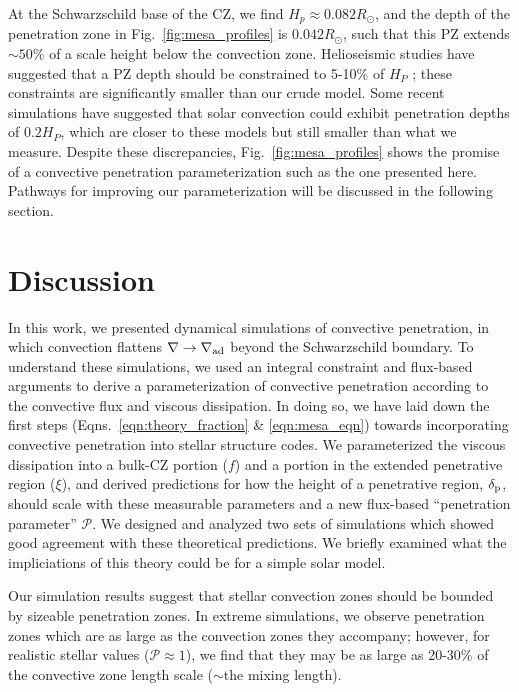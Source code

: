\documentclass[twocolumn]{aastex631}
\newcommand{\gradad}{\ensuremath{\nabla_{\rm{ad}}}}
\newcommand{\justgrad}{\ensuremath{\nabla}}
\newcommand{\delp}{\ensuremath{\delta_{\rm{p}}}}
\newcommand{\mP}{\ensuremath{\mathcal{P}}}
\begin{document}
At the Schwarzschild base of the CZ, we find $H_p \approx 0.082R_\odot$, and the depth of the penetration zone in Fig.~\ref{fig:mesa_profiles} is $0.042R_\odot$, such that this PZ extends $\sim 50$\% of a scale height below the convection zone.
Helioseismic studies have suggested that a PZ depth should be constrained to 5-10\% of $H_P$ \citep{basu_etal_1994, basu2016}; these constraints are significantly smaller than our crude model.
Some recent simulations \citep{kapyla2019} have suggested that solar convection could exhibit penetration depths of $0.2 H_P$, which are closer to these models but still smaller than what we measure.
Despite these discrepancies, Fig.~\ref{fig:mesa_profiles} shows the promise of a convective penetration parameterization such as the one presented here.
Pathways for improving our parameterization will be discussed in the following section.


\section{Discussion}
\label{sec:discussion}
In this work, we presented dynamical simulations of convective penetration, in which convection flattens $\justgrad \rightarrow \gradad$ beyond the Schwarzschild boundary.
To understand these simulations, we used an integral constraint \citep[reminiscent of][]{roxburgh1989} and flux-based arguments \citep[similar to][]{zahn1991} to derive a parameterization of convective penetration according to the convective flux and viscous dissipation.
In doing so, we have laid down the first steps (Eqns.~\ref{eqn:theory_fraction} \& \ref{eqn:mesa_eqn}) towards incorporating convective penetration into stellar structure codes.
We parameterized the viscous dissipation into a bulk-CZ portion ($f$) and a portion in the extended penetrative region ($\xi$), and derived predictions for how the height of a penetrative region, $\delp$, should scale with these measurable parameters and a new flux-based ``penetration parameter'' $\mP$.
We designed and analyzed two sets of simulations which showed good agreement with these theoretical predictions.
We briefly examined what the impliciations of this theory could be for a simple solar model.

Our simulation results suggest that stellar convection zones should be bounded by sizeable penetration zones.
In extreme simulations, we observe penetration zones which are as large as the convection zones they accompany; however, for realistic stellar values ($\mP \approx 1$), we find that they may be as large as 20-30\% of the convective zone length scale ($\sim$the mixing length).
\end{document}

